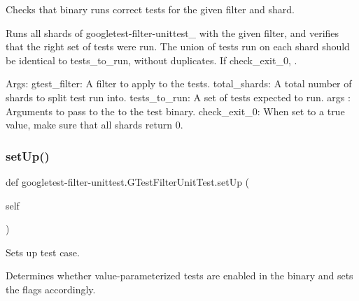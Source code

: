 \begin{DoxyVerb}Checks that binary runs correct tests for the given filter and shard.

Runs all shards of googletest-filter-unittest_ with the given filter, and
verifies that the right set of tests were run. The union of tests run
on each shard should be identical to tests_to_run, without duplicates.
If check_exit_0, .

Args:
  gtest_filter: A filter to apply to the tests.
  total_shards: A total number of shards to split test run into.
  tests_to_run: A set of tests expected to run.
  args   :      Arguments to pass to the to the test binary.
  check_exit_0: When set to a true value, make sure that all shards
            return 0.
\end{DoxyVerb}
 \mbox{\label{classgoogletest-filter-unittest_1_1GTestFilterUnitTest_a5aedf9d24243167acee87c9ddba82cc7}} 
\subsubsection{\texorpdfstring{set\+Up()}{setUp()}}
{\footnotesize\ttfamily def googletest-\/filter-\/unittest.\+G\+Test\+Filter\+Unit\+Test.\+set\+Up (\begin{DoxyParamCaption}\item[{}]{self }\end{DoxyParamCaption})}

\begin{DoxyVerb}Sets up test case.

Determines whether value-parameterized tests are enabled in the binary and
sets the flags accordingly.
\end{DoxyVerb}
 \mbox{\label{classgoogletest-filter-unittest_1_1GTestFilterUnitTest_a06eb05518484509b13dc139aafd610ce}} 
